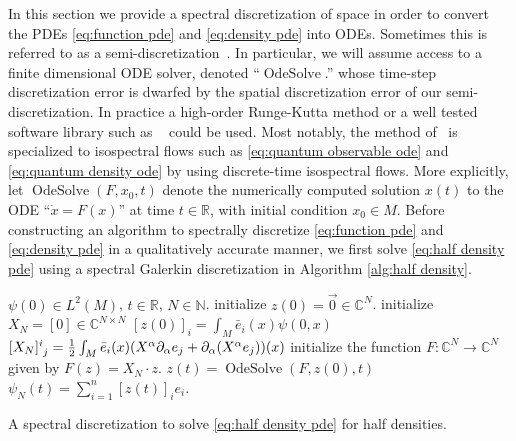 \documentclass[final,leqno]{siamart}
\newcommand{\ram}[1]{{\normalsize{\textbf{({\color{red}RAMBO:\ }#1)}}}}
\DeclareMathOperator{\OdeSolve}{OdeSolve}
\begin{document}

In this section we provide a spectral discretization of space in order to convert the PDEs \eqref{eq:function pde} and \eqref{eq:density pde} into ODEs.
Sometimes this is referred to as a semi-discretization~\cite{Gottlieb1977numerical}.
In particular, we will assume access to a finite dimensional ODE solver, denoted ``$\OdeSolve$.'' whose time-step discretization error is dwarfed by the spatial discretization error of our semi-discretization. 
In practice a high-order Runge-Kutta method or a well tested software library such as ~\cite{VODE} could be used.
Most notably, the method of~\cite{Calvo1997} is specialized to isospectral flows such as  \eqref{eq:quantum observable ode} and \eqref{eq:quantum density ode} by using discrete-time isospectral flows.
More explicitly, let $\OdeSolve ( F , x_{0} , t )$ denote the numerically computed solution $x(t)$ to the ODE ``$\dot{x} = F(x)$'' at time $t \in \mathbb{R}$, with initial condition $x_{0} \in M$.
Before constructing an algorithm to spectrally discretize \eqref{eq:function pde} and \eqref{eq:density pde} in a qualitatively accurate manner, we first solve \eqref{eq:half density pde} using a spectral Galerkin discretization in Algorithm \ref{alg:half density}.

\begin{algorithm}
\begin{algorithmic}
	\REQUIRE $\psi(0) \in L^{2}(M)$, $t \in \mathbb{R}$, $N \in \mathbb{N}$.
	\STATE initialize $z(0) = \vec{0} \in \mathbb{C}^{N}$.
	\STATE initialize $X_{N} = [0] \in \mathbb{C}^{N \times N}$
		\STATE $[z(0)]_{i} = \int_{M} \bar{e}_{i}(x) \psi(0,x)$
			\STATE $[X_{N}]\indices{^{i}_{j}} = \frac{1}{2} \int_{M} \bar{e}_{i}(x) ( X^{\alpha} \partial_{\alpha} e_{j} + \partial_{\alpha}( X^{\alpha} e_{j}) )(x)$
		\ENDFOR
	\ENDFOR
	\STATE initialize the function $F: \mathbb{C}^{N} \to \mathbb{C}^{N}$ given by $F(z) = X_{N} \cdot z$.
	\STATE $z(t) = \operatorname{OdeSolve}(  F , z(0) , t)$
	\RETURN  $\psi_{N}(t) = \sum_{i=1}^{n} [z(t)]_{i} e_{i}$.
\end{algorithmic}
\caption{A spectral discretization to solve \eqref{eq:half density pde} for half densities.} \label{alg:half density}
\end{algorithm}
\end{document}
